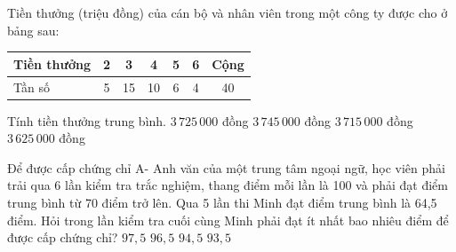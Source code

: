 \begin{ex}
	Tiền thưởng (triệu đồng) của cán bộ và nhân viên trong một công ty được cho ở bảng sau:
	\begin{center}
	\begin{tabular}{|l|c|c|c|c|c|c|}
		\hline
		Tiền thưởng & 2 & 3 & 4 & 5 & 6 & Cộng \\
		\hline
		Tần số & 5 & 15 & 10 & 6 & 4 & 40 \\
		\hline
	\end{tabular}
	\end{center}
	Tính tiền thưởng trung bình.
	\choice
	{\True $3\,725\,000$ đồng}
	{$3\,745\,000$ đồng}
	{$3\,715\,000$ đồng}
	{$3\,625\,000$ đồng}
\end{ex}

\begin{ex}
	Để được cấp chứng chỉ A- Anh văn của một trung tâm ngoại ngữ, học viên phải trải qua 6 lần kiểm tra trắc nghiệm, thang điểm mỗi lần là 100 và phải đạt điểm trung bình từ 70 điểm trở lên. Qua 5 lần thi Minh đạt điểm trung bình là 64,5 điểm. Hỏi trong lần kiểm tra cuối cùng Minh phải đạt ít nhất bao nhiêu điểm để được cấp chứng chỉ?
	\choice
	{\True $97{,}5$}
	{$96{,}5$}
	{$94{,}5$}
	{$93{,}5$}
\end{ex}

